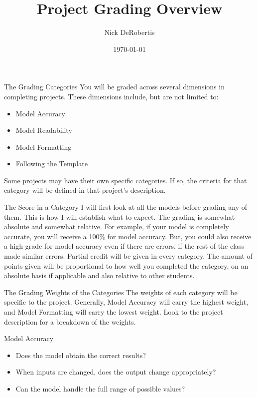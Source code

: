 \documentclass[]{article}
\begin{document}
\title{Project Grading Overview}
\author{Nick DeRobertis}
\date{\today}
\maketitle
\begin{section}{The Grading Categories}
You will be graded across several dimensions in completing projects. These dimensions include, but are not limited to: 
\begin{itemize}
\item Model Accuracy
\item Model Readability
\item Model Formatting
\item Following the Template
\end{itemize}
Some projects may have their own specific categories. If so, the criteria for that category will be defined in that project's description.
\end{section}
\begin{section}{The Score in a Category}
I will first look at all the models before grading any of them. This is how I will establish what to expect. The grading is somewhat absolute and somewhat relative. For example, if your model is completely accurate, you will receive a 100\% for model accuracy. But, you could also receive a high grade for model accuracy even if there are errors, if the rest of the class made similar errors. Partial credit will be given in every category. The amount of points given will be proportional to how well you completed the category, on an absolute basis if applicable and also relative to other students.
\end{section}
\begin{section}{The Grading Weights of the Categories}
The weights of each category will be specific to the project. Generally, Model Accuracy will carry the highest weight, and Model Formatting will carry the lowest weight. Look to the project description for a breakdown of the weights.
\end{section}
\begin{section}{Model Accuracy}
\begin{itemize}
\item Does the model obtain the correct results?
\item When inputs are changed, does the output change appropriately?
\item Can the model handle the full range of possible values?
\end{itemize}
\end{section}
\end{document}
